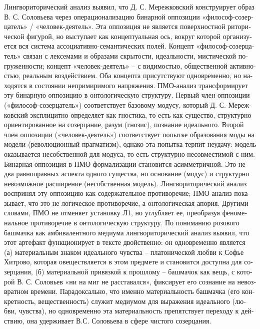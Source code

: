 \begin{russian}
    Лингвориторический анализ выявил, что Д. С. Мережковский конструирует образ В. С. Соловьева через операционализацию бинарной оппозиции «философ-созерцатель» / «человек-деятель». Эта оппозиция не является поверхностной риторической фигурой, но выступает как концептуальная ось, вокруг которой организуется вся система ассоциативно-семантических полей. Концепт «философ-созерцатель» связан с лексемами и образами скрытости, идеальности, мистической погруженности; концепт «человек-деятель» – с видимостью, общественной активностью, реальным воздействием. Оба концепта присутствуют одновременно, но находятся в состоянии непримиримого напряжения.
    ПМО-анализ трансформирует эту бинарную оппозицию в онтологическую структуру. Первый член оппозиции («философ-созерцатель») соответствует базовому модусу, который Д. С. Мережковский эксплицитно определяет как гностика, то есть как существо, структурно ориентированное на созерцание, разум (гнозис), познание идеального. Второй член оппозиции («человек-деятель») соответствует попытке образования моды на модели (революционный прагматизм), однако эта попытка терпит неудачу: модель оказывается несобственной для модуса, то есть структурно несовместимой с ним. Бинарная оппозиция в ПМО-формализации становится асимметричной. Это не два равноправных аспекта одного существа, но основание (модус) и структурно невозможное расширение (несобственная модель). Лингвориторический анализ воспринял эту оппозицию как содержательное противоречие; ПМО-анализ показывает, что это не логическое противоречие, а онтологическая апория.
    Другими словами, ПМО не отменяет установку Л1, но углубляет ее, преобразуя феноменальное противоречие в онтологическую структуру.
    По пониманию розового башмачка как амбивалентного медиума лингвориторический анализ выявил, что этот артефакт функционирует в тексте двойственно: он одновременно является (а) материальным знаком идеального чувства – платонической любви к Софье Хитрово, которая овеществляется в этом предмете и становится доступна для созерцания, (б) материальной привязкой к прошлому – башмачок как вещь, с которой В. С. Соловьев «ни на миг не расставался», фиксирует его сознание на невозвратном времени. Парадоксально, что именно материальность башмачка (его конкретность, вещественность) служит медиумом для выражения идеального (любви, чувства), но одновременно эта материальность препятствует переходу к действию, она удерживает В.С. Соловьева в сфере чистого созерцания.

\end{russian}
